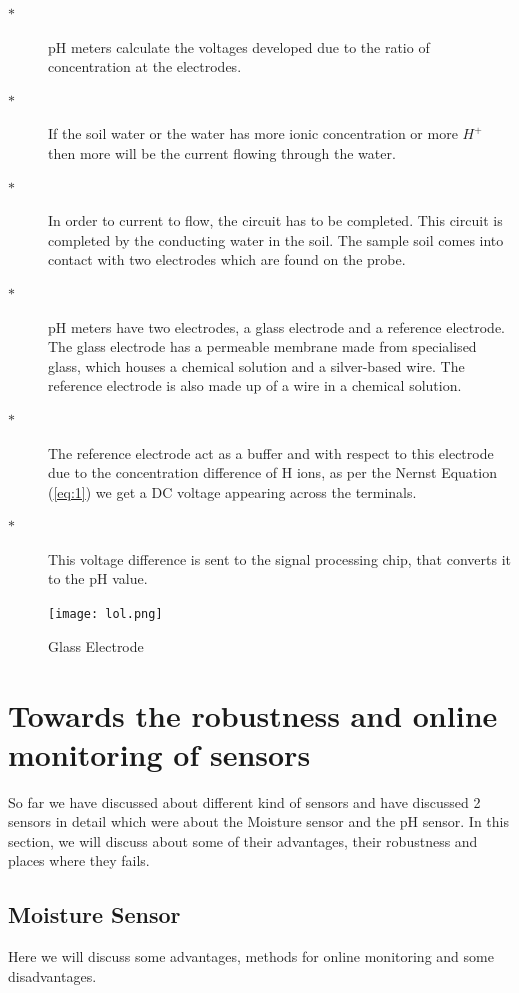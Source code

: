 \documentclass[11pt]{article}
\begin{document}
\begin{description}
\item[$\ast$] pH meters calculate the voltages developed due to the ratio of concentration at the electrodes. 
\item[$\ast$]If the soil water or the water has more ionic concentration or more \(H^{+}\) then more will be the current flowing through the water.  
\item[$\ast$] In order to current to flow, the circuit has to be completed. This circuit is completed by the conducting water in the soil. The sample soil comes into contact with two electrodes which are found on the probe.
\item[$\ast$] pH meters have two electrodes, a glass electrode and a reference electrode.
The glass electrode has a permeable membrane made from specialised glass, which houses a chemical solution and a silver-based wire. The reference electrode is also made up of a wire in a chemical solution. 
\item[$\ast$] The reference electrode act as a buffer and with respect to this electrode due to the concentration difference of H ions, as per the Nernst Equation (\ref{eq:1}) we get a DC voltage appearing across the terminals. 
\item[$\ast$] This voltage difference is sent to the signal processing chip, that converts it to the pH value. 
\end{description}


\begin{figure}[h]
  \centering
    \vspace*{0 cm}
  \texttt{[image: lol.png]}
    \caption{Glass Electrode \cite{ref4}}
  \label{fig:Soil Moisture Sensor}
\end{figure}

\section{Towards the robustness and online monitoring of sensors}
So far we have discussed about different kind of sensors and have discussed 2 sensors in detail which were about the Moisture sensor and the pH sensor. In this section, we will discuss about some of their advantages, their robustness and places where they fails. \\
\subsection{Moisture Sensor}
Here we will discuss some advantages, methods for online monitoring and some disadvantages.\\
\end{document}
